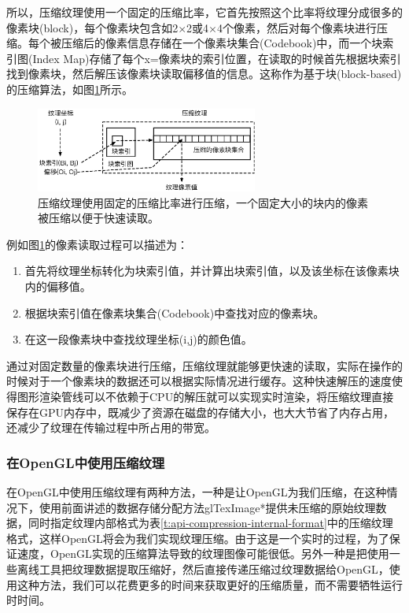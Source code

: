 所以，压缩纹理使用一个固定的压缩比率，它首先按照这个比率将纹理分成很多的像素块(block)，每个像素块包含如2$\times$2或4$\times$4个像素，然后对每个像素块进行压缩。每个被压缩后的像素信息存储在一个像素块集合(Codebook)中，而一个块索引图(Index Map)存储了每个x=像素块的索引位置，在读取的时候首先根据块索引找到像素块，然后解压该像素块读取偏移值的信息。这称作为基于块(block-based)的压缩算法，如图\ref{f:api-compression}所示。

\begin{figure}
\sidecaption
	\includegraphics[width=0.65\textwidth]{figures/api/compression}
	\caption{压缩纹理使用固定的压缩比率进行压缩，一个固定大小的块内的像素被压缩以便于快速读取。}
	\label{f:api-compression}
\end{figure}

例如图\ref{f:api-compression}的像素读取过程可以描述为：

\begin{enumerate}
	\item 首先将纹理坐标转化为块索引值，并计算出块索引值，以及该坐标在该像素块内的偏移值。
	\item 根据块索引值在像素块集合(Codebook)中查找对应的像素块。
	\item 在这一段像素块中查找纹理坐标(i,j)的颜色值。
\end{enumerate}

通过对固定数量的像素块进行压缩，压缩纹理就能够更快速的读取，实际在操作的时候对于一个像素块的数据还可以根据实际情况进行缓存。这种快速解压的速度使得图形渲染管线可以不依赖于CPU的解压就可以实现实时渲染，将压缩纹理直接保存在GPU内存中，既减少了资源在磁盘的存储大小，也大大节省了内存占用，还减少了纹理在传输过程中所占用的带宽。





\subsubsection{在OpenGL中使用压缩纹理}
在OpenGL中使用压缩纹理有两种方法，一种是让OpenGL为我们压缩，在这种情况下，使用前面讲述的数据存储分配方法glTexImage*提供未压缩的原始纹理数据，同时指定纹理内部格式为表\ref{t:api-compression-internal-format}中的压缩纹理格式，这样OpenGL将会为我们实现纹理压缩。由于这是一个实时的过程，为了保证速度，OpenGL实现的压缩算法导致的纹理图像可能很低。另外一种是把使用一些离线工具把纹理数据提取压缩好，然后直接传递压缩过纹理数据给OpenGL，使用这种方法，我们可以花费更多的时间来获取更好的压缩质量，而不需要牺牲运行时时间。

